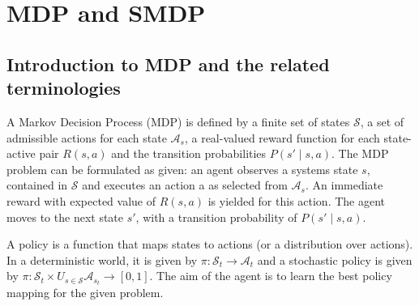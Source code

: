 \appendix
\section{MDP and SMDP}
\subsection{Introduction to MDP and the related terminologies}



A Markov Decision Process (MDP) is defined by a finite set of states \(\mathcal{S}\), a set of admissible actions for each state \(\mathcal{A}_s\), a real-valued reward function for each state-active pair \(R(s,a)\) and the transition probabilities \(P(s' \mid s,a)\). The MDP problem can be formulated as given: an agent observes a systems state \(s\), contained in \(\mathcal{S}\) and executes an action a as selected from \(\mathcal{A}_s\). An immediate reward with expected value of \(R(s,a)\) is yielded for this action. The agent moves to the next state  \(s'\), with a transition probability of \(P(s' \mid s,a)\).  

A policy is a function that maps states to actions (or a distribution over actions).  In a deterministic world, it is given by \(\pi:\mathcal{S}_t \rightarrow \mathcal{A}_t\) and a stochastic policy is given by \(\pi:\mathcal{S}_t \times U_{s \in \mathcal{S}} \mathcal{A}_{s_t} \rightarrow [0,1]\). The aim of the agent is to learn the best policy mapping for the given problem.   

